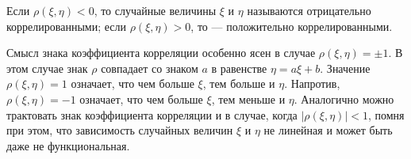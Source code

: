 \begin{definition}
\label{def:19.11}
	Если $\rho(\xi, \eta) < 0$, то случайные величины $\xi$ и $\eta$
называются отрицательно коррелированными; если $\rho(\xi, \eta) > 0$, то — положительно коррелированными.
\end{definition}
\begin{zam}\label{zam:19.12}
Смысл знака коэффициента корреляции особенно ясен
в случае $\rho(\xi, \eta) = \pm 1$. В этом случае знак $\rho$ совпадает со знаком $a$ в равенстве $\eta = a\xi + b$. Значение $\rho(\xi, \eta) = 1$ означает, что чем больше $\xi$, тем больше и $\eta$. Напротив, $\rho(\xi, \eta) = −1$ означает, что чем больше $\xi$, тем меньше и $\eta$. Аналогично можно трактовать знак коэффициента корреляции и
в случае, когда $|\rho(\xi, \eta)| < 1$, помня при этом, что зависимость случайных
величин $\xi$ и $\eta$ не линейная и может быть даже не функциональная.
\end{zam}

